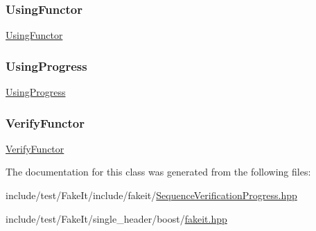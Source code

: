 \subsubsection{\texorpdfstring{UsingFunctor}{UsingFunctor}}
{\footnotesize\ttfamily \mbox{\hyperlink{classfakeit_1_1UsingFunctor}{Using\+Functor}}\hspace{0.3cm}{\ttfamily [friend]}}

\mbox{\label{classfakeit_1_1SequenceVerificationProgress_ae3800a95408d01063726713e29fcd4b1}} 
\subsubsection{\texorpdfstring{UsingProgress}{UsingProgress}}
{\footnotesize\ttfamily \mbox{\hyperlink{classfakeit_1_1UsingProgress}{Using\+Progress}}\hspace{0.3cm}{\ttfamily [friend]}}

\mbox{\label{classfakeit_1_1SequenceVerificationProgress_a2a01b098d4a5791a5a03c1a440b1f20a}} 
\subsubsection{\texorpdfstring{VerifyFunctor}{VerifyFunctor}}
{\footnotesize\ttfamily \mbox{\hyperlink{classfakeit_1_1VerifyFunctor}{Verify\+Functor}}\hspace{0.3cm}{\ttfamily [friend]}}



The documentation for this class was generated from the following files\+:\begin{DoxyCompactItemize}
\item 
include/test/\+Fake\+It/include/fakeit/\mbox{\hyperlink{SequenceVerificationProgress_8hpp}{Sequence\+Verification\+Progress.\+hpp}}\item 
include/test/\+Fake\+It/single\+\_\+header/boost/\mbox{\hyperlink{single__header_2boost_2fakeit_8hpp}{fakeit.\+hpp}}\end{DoxyCompactItemize}
